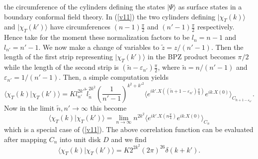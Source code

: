 \documentclass[a4paper,12pt]{article}
\begin{document}
the circumference of the cylinders defining the states $|\Psi\rangle$ as
surface states in a boundary conformal field theory. In (\ref{v11}) the
two cylinders defining $|\chi_T(k)\rangle$ and $|\chi_T(k')\rangle$ have
circumferences $(n-1)\frac{\pi}{2}$ and $(n'-1)\frac{\pi}{2}$ respectively.
Hence take for the moment these normalization factors to be $l_n=n-1$ and
$l_{n'}=n'-1$. We now make a change of variables to $\tilde z=z/(n'-1)$.
Then the length of the first strip representing $|\chi_T(k')\rangle$ in
the BPZ product becomes $\pi/2$ while the length of the second strip
is $(\tilde n-\varepsilon_{n'})\frac{\pi}{2}$, where $\tilde n=n/(n'-1)$
and $\varepsilon_{n'}=1/(n'-1)$. Then, a simple computation yields
\begin{equation}
\langle\chi_T(k)|\chi_T(k')\rangle=
Kl_{n'}^{2{k'}^2}\tilde l_{\tilde n}^{2k^2}
\left(\frac{1}{n'-1}\right)^{k^2+{k'}^2}
\langle e^{ik'.X\left((\tilde n+1-\varepsilon_{n'})\frac{\pi}{4}\right)}
e^{ik.X(0)}\rangle_{C_{\tilde n+1-\varepsilon_{n'}}} .
\label{norm}
\end{equation}
Now in the limit $\tilde n, n'\to\infty$ this become
\begin{equation}
\langle\chi_T(k)|\chi_T(k')\rangle=
\lim_{n\to\infty} n^{2k^2}
\langle e^{ik'.X(n\frac{\pi}{4})} e^{ik.X(0)}\rangle_{C_n}
\label{norm1}
\end{equation}
which is a special case of (\ref{v11}). The above correlation function can
be evaluated after mapping $C_n$ into unit disk $D$ and we find
\begin{equation}
\langle\chi_T(k)|\chi_T(k')\rangle
=K2^{2k^2}(2\pi)^{26}\delta(k+k') .
\label{v13}
\end{equation}
\end{document}
